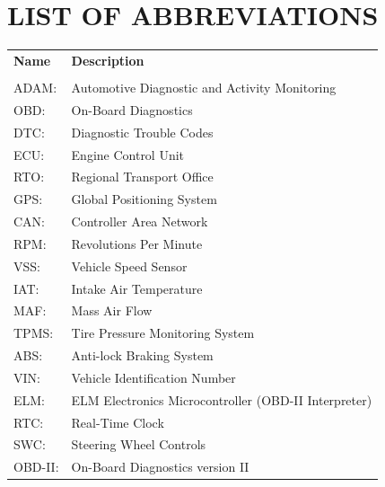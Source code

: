 
\newpage
\chapter*{\centering LIST OF ABBREVIATIONS}

\begin{center}
\begin{tabular}{l@{\hspace{2cm}}l}
\textbf{Name} & \textbf{Description} \\
\\[-0.3cm]
ADAM: & Automotive Diagnostic and Activity Monitoring \\
OBD:  & On-Board Diagnostics \\
DTC:  & Diagnostic Trouble Codes \\
ECU:  & Engine Control Unit \\
RTO:  & Regional Transport Office \\
GPS:  & Global Positioning System \\
CAN:  & Controller Area Network \\
RPM:  & Revolutions Per Minute \\
VSS:  & Vehicle Speed Sensor \\
IAT:  & Intake Air Temperature \\
MAF:  & Mass Air Flow \\
TPMS: & Tire Pressure Monitoring System \\
ABS:  & Anti-lock Braking System \\
VIN:  & Vehicle Identification Number \\
ELM:  & ELM Electronics Microcontroller (OBD-II Interpreter) \\
RTC:  & Real-Time Clock \\
SWC:  & Steering Wheel Controls \\
OBD-II: & On-Board Diagnostics version II \\
\end{tabular}
\end{center}

